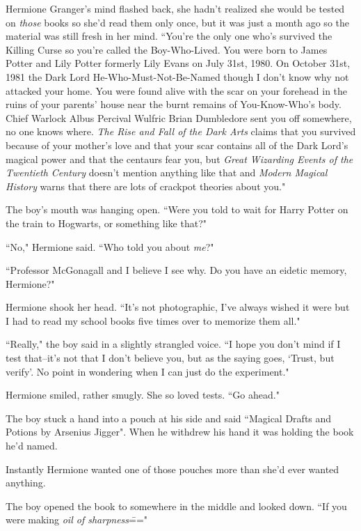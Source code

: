 Hermione Granger's mind flashed back, she hadn't realized she would be tested on \emph{those} books so she'd read them only once, but it was just a month ago so the material was still fresh in her mind. ``You're the only one who's survived the Killing Curse so you're called the Boy-Who-Lived. You were born to James Potter and Lily Potter formerly Lily Evans on July 31st, 1980. On October 31st, 1981 the Dark Lord He-Who-Must-Not-Be-Named though I don't know why not attacked your home. You were found alive with the scar on your forehead in the ruins of your parents' house near the burnt remains of You-Know-Who's body. Chief Warlock Albus Percival Wulfric Brian Dumbledore sent you off somewhere, no one knows where. \emph{The Rise and Fall of the Dark Arts} claims that you survived because of your mother's love and that your scar contains all of the Dark Lord's magical power and that the centaurs fear you, but \emph{Great Wizarding Events of the Twentieth Century} doesn't mention anything like that and \emph{Modern Magical History} warns that there are lots of crackpot theories about you."

The boy's mouth was hanging open. ``Were you told to wait for Harry Potter on the train to Hogwarts, or something like that?"

``No," Hermione said. ``Who told you about \emph{me}?"

``Professor McGonagall and I believe I see why. Do you have an eidetic memory, Hermione?"

Hermione shook her head. ``It's not photographic, I've always wished it were but I had to read my school books five times over to memorize them all."

``Really," the boy said in a slightly strangled voice. ``I hope you don't mind if I test that\---it's not that I don't believe you, but as the saying goes, `Trust, but verify'. No point in wondering when I can just do the experiment."

Hermione smiled, rather smugly. She so loved tests. ``Go ahead."

The boy stuck a hand into a pouch at his side and said ``Magical Drafts and Potions by Arsenius Jigger". When he withdrew his hand it was holding the book he'd named.

Instantly Hermione wanted one of those pouches more than she'd ever wanted anything.

The boy opened the book to somewhere in the middle and looked down. ``If you were making \emph{oil of sharpness}\==="


